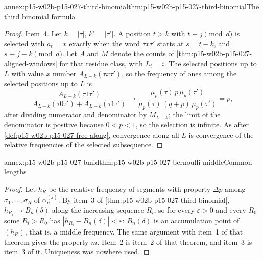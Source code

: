 \begin{annexitem}{annex:p15-w02b-p15-027-third-binomial}{thm:p15-w02b-p15-027-third-binomial}{The third binomial formula}
\begin{proof}
Item~4. Let \(k=|\tau|\), \(k'=|\tau'|\). A position \(t>k\) with
\(t\equiv j\pmod d\) is selected with \(a_t=x\) exactly when the word
\(\tau x\tau'\) starts at \(s=t-k\), and \(s\equiv j-k\pmod d\). Let
\(A\) and \(M\) denote the counts of
\cref{thm:p15-w02b-p15-027-aligned-windows} for that residue class, with
\(L_i=i\). The selected positions up to \(L\) with value \(x\) number
\(A_{L-k}(\tau x\tau')\), so the frequency of ones among the selected
positions up to \(L\) is
\[
 \frac{A_{L-k}(\tau1\tau')}{A_{L-k}(\tau0\tau')+A_{L-k}(\tau1\tau')}
 \longrightarrow
 \frac{\mu_p(\tau)\,p\,\mu_p(\tau')}{\mu_p(\tau)\,(q+p)\,\mu_p(\tau')}=p,
\]
after dividing numerator and denominator by \(M_{L-k}\); the limit of the
denominator is positive because \(0<p<1\), so the selection is infinite.
As after \cref{def:p15-w02b-p15-027-free-along}, convergence along all
\(L\) is convergence of the relative frequencies of the selected
subsequence.
\end{proof}
\end{annexitem}

\begin{annexitem}{annex:p15-w02b-p15-027-bmid}{thm:p15-w02b-p15-027-bernoulli-middle}{Common lengths}
\begin{proof}
Let \(h_R\) be the relative frequency of segments with property
\(\Delta p\) among \(\sigma_1,\ldots,\sigma_R\) of \(\alpha_n^{(j)}\). By
item~3 of \cref{thm:p15-w02b-p15-027-third-binomial},
\(h_{R_i}\to B_n(\delta)\) along the increasing sequence \(R_i\), so for
every \(\varepsilon>0\) and every \(R_0\) some \(R_i>R_0\) has
\(|h_{R_i}-B_n(\delta)|<\varepsilon\): \(B_n(\delta)\) is an accumulation
point of \((h_R)\), that is, a middle frequency. The same argument with
item~1 of that theorem gives the property \(m\). Item~2 is item~2 of
that theorem, and item~3 is item~3 of it. Uniqueness was nowhere used.
\end{proof}
\end{annexitem}


